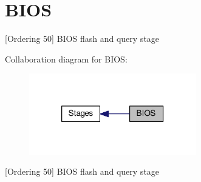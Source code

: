 \hypertarget{group___b_i_o_s}{\section{B\-I\-O\-S}
\label{group___b_i_o_s}
}


\mbox{[}Ordering 50\mbox{]} B\-I\-O\-S flash and query stage  


Collaboration diagram for B\-I\-O\-S\-:
\nopagebreak
\begin{figure}[H]
\begin{center}
\leavevmode
\includegraphics[width=206pt]{group___b_i_o_s}
\end{center}
\end{figure}
\mbox{[}Ordering 50\mbox{]} B\-I\-O\-S flash and query stage 